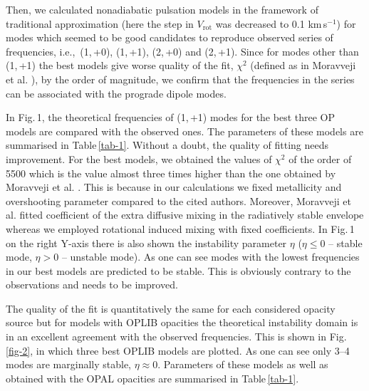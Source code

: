 \documentclass[epj,twocolumn]{webofc}
\begin{document}
Then, we calculated nonadiabatic pulsation models in the framework of traditional approximation
(here the step in $V_\mathrm{rot}$ was decreased to 0.1 km\,s$^{-1}$)
for modes which seemed to be good candidates to reproduce observed series of frequencies, i.e.,\,
(1,\,+0), (1,\,+1), (2,\,+0) and (2,\,+1).
Since for modes other than (1,\,+1) the best models give worse quality of the fit,
$\chi^{2}$ (defined as in Moravveji et al. \citep{Moravveji2016}),
by the order of magnitude, we confirm that the frequencies in the series
can be associated with the prograde dipole modes.


In Fig.\,1, the theoretical frequencies of (1,\,+1) modes for the best three OP models are
compared with the observed ones. The parameters of these models are summarised in Table\,\ref{tab-1}.
Without a doubt, the quality of fitting
needs  improvement. For the best models, we obtained the values of $\chi^2$ of the order of 5500 which is the value
almost three times higher than the one obtained by Moravveji et al. \citep{Moravveji2016}.
This is because in our calculations we fixed metallicity and overshooting parameter
compared to the cited authors. Moreover, Moravveji et al. fitted coefficient of the extra diffusive mixing in
the radiatively stable envelope whereas we employed rotational induced mixing with fixed coefficients.
In Fig.\,1 on the right Y-axis there is also shown the instability parameter $\eta$
($\eta\le0$ -- stable mode, $\eta>0$ -- unstable mode). As one can see modes with the lowest frequencies
in our best models are predicted to be stable. This is obviously contrary to the observations
and needs to be improved.

The quality of the fit is quantitatively the same for each considered opacity source
but for models with OPLIB opacities the theoretical instability domain is in an excellent agreement
with the observed frequencies. This is shown in Fig.\,\ref{fig-2}, in which three
best OPLIB models are plotted. As one can see only 3--4 modes are
marginally stable, $\eta\approx0$.
Parameters of these models as well as obtained with the OPAL
opacities are summarised in Table\,\ref{tab-1}.
\end{document}
